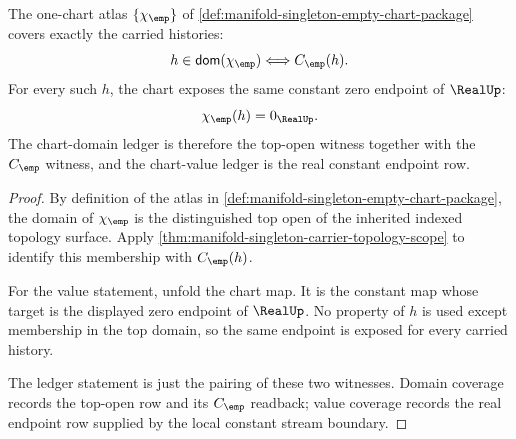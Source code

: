 \begin{theorem}
\label{thm:manifold-singleton-chart-coverage}
The one-chart atlas $\{\chi_{\emp}\}$ of
\autoref{def:manifold-singleton-empty-chart-package} covers exactly the
carried histories:
$$
h\in\mathsf{dom}(\chi_{\emp})
\Longleftrightarrow
C_{\emp}(h).
$$
For every such $h$, the chart exposes the same constant zero endpoint of
$\RealUp$:
$$
\chi_{\emp}(h)=0_{\RealUp}.
$$
The chart-domain ledger is therefore the top-open witness together with the
$C_{\emp}$ witness, and the chart-value ledger is the real constant endpoint
row.
\end{theorem}
\begin{proof}
By definition of the atlas in
\autoref{def:manifold-singleton-empty-chart-package}, the domain of
$\chi_{\emp}$ is the distinguished top open of the inherited indexed topology
surface. Apply
\autoref{thm:manifold-singleton-carrier-topology-scope} to identify this
membership with $C_{\emp}(h)$.

For the value statement, unfold the chart map. It is the constant map whose
target is the displayed zero endpoint of $\RealUp$. No property of $h$ is used
except membership in the top domain, so the same endpoint is exposed for every
carried history.

The ledger statement is just the pairing of these two witnesses. Domain
coverage records the top-open row and its $C_{\emp}$ readback; value coverage
records the real endpoint row supplied by the local constant stream boundary.
\end{proof}


